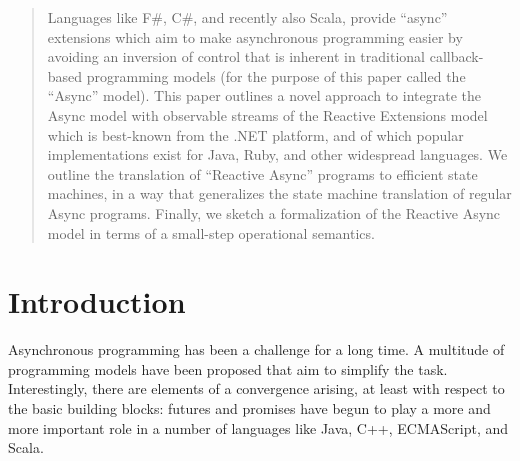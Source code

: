 \documentclass{acm_proc_article-sp}
\begin{document}
\maketitle
\begin{abstract}

Languages like F\#, C\#, and recently also Scala, provide ``async'' extensions
which aim to make asynchronous programming easier by avoiding an inversion of
control that is inherent in traditional callback-based programming models (for
the purpose of this paper called the ``Async'' model). This paper outlines a
novel approach to integrate the Async model with observable streams of the
Reactive Extensions model which is best-known from the .NET platform, and of
which popular implementations exist for Java, Ruby, and other widespread
languages. We outline the translation of ``Reactive Async'' programs to
efficient state machines, in a way that generalizes the state machine
translation of regular Async programs. Finally, we sketch a formalization of
the Reactive Async model in terms of a small-step operational semantics.

\end{abstract}




\section{Introduction}

Asynchronous programming has been a challenge for a long time. A multitude of
programming models have been proposed that aim to simplify the task.
Interestingly, there are elements of a convergence arising, at least with
respect to the basic building blocks: futures and promises have begun to play
a more and more important role in a number of languages like Java, C++,
ECMAScript, and Scala.
\end{document}

